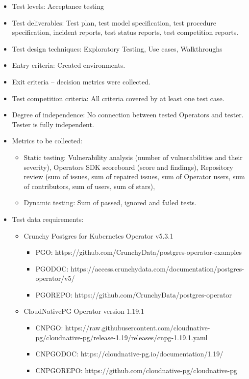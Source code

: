 \begin{itemize}
\begin{itemize}
          \item Test levels: Acceptance testing
          \item Test deliverables: Test plan, test model specification, test procedure specification, incident reports, test status reports, test competition reports.
          \item Test design techniques: Exploratory Testing, Use cases, Walkthroughs
          \item Entry criteria: Created environments.
          \item Exit criteria – decision metrics were collected.
          \item Test competition criteria: All criteria covered by at least one test case.
          \item Degree of independence: No connection between tested Operators and tester. Tester is fully independent.
          \item Metrics to be collected:
                \begin{itemize}
                  \item Static testing: Vulnerability analysis (number of vulnerabilities and their severity), Operators SDK scoreboard (score and findings), Repository review (sum of issues, sum of repaired issues, sum of Operator users, sum of contributors, sum of users, sum of stars),
                  \item Dynamic testing:  Sum of passed, ignored and failed tests.
                \end{itemize}
          \item Test data requirements:
                \begin{itemize}
                  \item Crunchy Postgres for Kubernetes Operator v5.3.1
                        \begin{itemize}
                          \item PGO: https://github.com/CrunchyData/postgres-operator-examples
                          \item PGODOC: https://access.crunchydata.com/documentation/postgres-operator/v5/
                          \item PGOREPO: https://github.com/CrunchyData/postgres-operator
                        \end{itemize}

                  \item CloudNativePG Operator version 1.19.1
                        \begin{itemize}
                          \item CNPGO: https://raw.githubusercontent.com/cloudnative-pg/cloudnative-pg/release-1.19/releases/cnpg-1.19.1.yaml
                          \item CNPGODOC: https://cloudnative-pg.io/documentation/1.19/
                          \item CNPGOREPO: https://github.com/cloudnative-pg/cloudnative-pg
                        \end{itemize}


\end{itemize}
\end{itemize}
\end{itemize}

